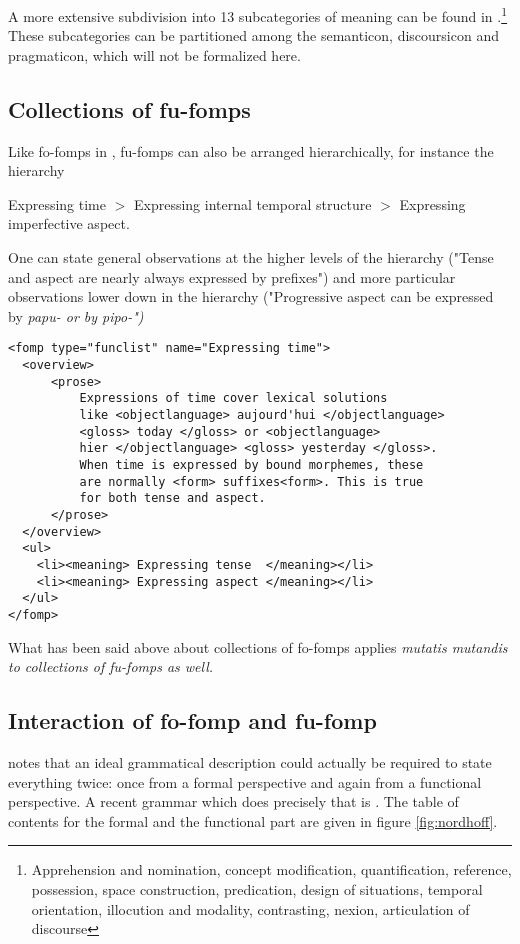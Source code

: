 A more extensive subdivision into 13 subcategories of meaning can be found in \citet{Lehmann2004docu}.\footnote{Apprehension 
 and nomination, concept modification, quantification, reference, possession, space construction, predication, design of situations, temporal orientation, illocution and modality, contrasting, nexion, articulation of discourse
}  
These subcategories can be partitioned among the semanticon, discoursicon and pragmaticon, which will not be formalized here.


\subsection{Collections of fu-fomps}
Like fo-fomps in , fu-fomps can also be arranged hierarchically, for instance the hierarchy

\ea Expressing time $>$ Expressing internal temporal structure $>$ Expressing imperfective aspect. \z

One can state general observations at the higher levels of the hierarchy ("Tense and aspect are nearly always expressed by prefixes") and more particular observations lower down in the hierarchy ("Progressive aspect can be expressed by \em papu- \em or by \em pipo-\em")

\ea\label{xml:funclist}
\begin{verbatim}
<fomp type="funclist" name="Expressing time">
  <overview>
      <prose>
          Expressions of time cover lexical solutions
          like <objectlanguage> aujourd'hui </objectlanguage>
          <gloss> today </gloss> or <objectlanguage>
          hier </objectlanguage> <gloss> yesterday </gloss>.
          When time is expressed by bound morphemes, these
          are normally <form> suffixes<form>. This is true
          for both tense and aspect.
      </prose>
  </overview>
  <ul>
    <li><meaning> Expressing tense  </meaning></li>
    <li><meaning> Expressing aspect </meaning></li>
  </ul>
</fomp>
\end{verbatim}
\z

What has been said above about collections of fo-fomps applies \em mutatis mutandis \em to collections of fu-fomps as well.


\subsection{Interaction of fo-fomp and fu-fomp}
\citet{Mosel2006craft} notes that an ideal grammatical description could actually be required to state everything twice: once from a formal perspective and again from a functional perspective. A recent grammar which does precisely that is \citet{Nordhoff2009phd}. The table of contents for the formal and the functional part are given in figure \ref{fig:nordhoff}.

